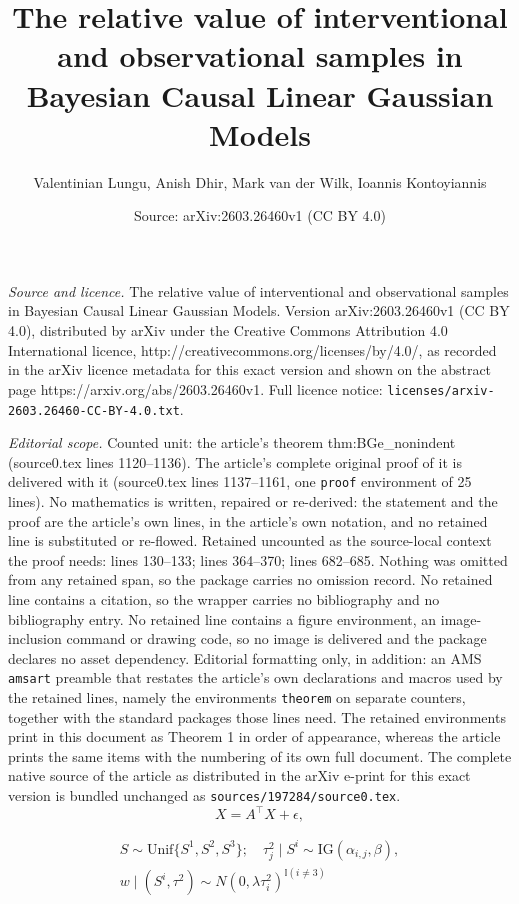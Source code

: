 \documentclass[10pt,a4paper]{amsart}
\title{The relative value of interventional and observational samples in Bayesian Causal Linear Gaussian Models}
\author{Valentinian Lungu, Anish Dhir, Mark van der Wilk, Ioannis Kontoyiannis}
\date{Source: arXiv:2603.26460v1 (CC BY 4.0)}
\def\transpose{\intercal}
\begin{document}
\maketitle

\noindent\emph{Source and licence.} The relative value of interventional and observational samples in Bayesian Causal Linear Gaussian Models. Version arXiv:2603.26460v1 (CC BY 4.0), distributed by arXiv under the Creative Commons Attribution 4.0 International licence, http://creativecommons.org/licenses/by/4.0/, as recorded in the arXiv licence metadata for this exact version and shown on the abstract page https://arxiv.org/abs/2603.26460v1. Full licence notice: \texttt{licenses/arxiv-2603.26460-CC-BY-4.0.txt}.\par\smallskip

\noindent\textit{Editorial scope.} Counted unit: the article's theorem thm:BGe\_nonindent (source0.tex lines 1120--1136). The article's complete original proof of it is delivered with it (source0.tex lines 1137--1161, one \texttt{proof} environment of 25 lines). No mathematics is written, repaired or re-derived: the statement and the proof are the article's own lines, in the article's own notation, and no retained line is substituted or re-flowed.  Retained uncounted as the source-local context the proof needs: lines 130--133; lines 364--370; lines 682--685.  Nothing was omitted from any retained span, so the package carries no omission record.  No retained line contains a citation, so the wrapper carries no bibliography and no bibliography entry.  No retained line contains a figure environment, an image-inclusion command or drawing code, so no image is delivered and the package declares no asset dependency.  Editorial formatting only, in addition: an AMS \texttt{amsart} preamble that restates the article's own declarations and macros used by the retained lines, namely the environments \texttt{theorem} on separate counters, together with the standard packages those lines need.  The retained environments print in this document as Theorem 1 in order of appearance, whereas the article prints the same items with the numbering of its own full document.  The complete native source of the article as distributed in the arXiv e-print for this exact version is bundled unchanged as \texttt{sources/197284/source0.tex}.
\begin{equation}
    X = A^\transpose X + \epsilon,
    \label{eq:SCM_vector}
\end{equation}

\begin{equation}
\label{eq:BGe_priors_compact}
\begin{split}
    S \sim \text{Unif}\{S^1, S^2, S^3\}; \quad \tau_j^2 \mid S^i \sim \text{IG}(\alpha_{i,j}, \beta), \\
    w \mid (S^i, \tau^2) \sim N(0, \lambda\tau_i^2)^{\mathbb{I}(i \neq 3)}
\end{split}
\end{equation}
\end{document}
